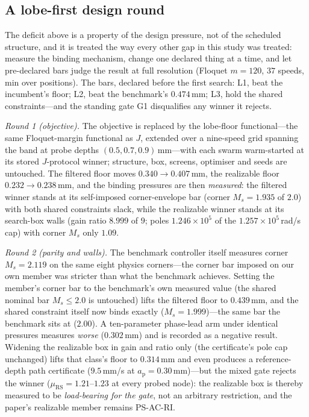 \documentclass[preprint,12pt]{elsarticle}
\newcommand{\ap}{a_{\mathrm{p}}}
\newcommand{\muRS}{\mu_{\mathrm{RS}}}
\begin{document}
\subsection*{A lobe-first design round}
\label{sec:lobefirst}

The deficit above is a property of the design pressure, not of the
scheduled structure, and it is treated the way every other gap in
this study was treated: measure the binding mechanism, change one
declared thing at a time, and let pre-declared bars judge the result
at full resolution (Floquet $m = 120$, $37$ speeds, min over
positions).  The bars, declared before the first search: L1, beat the
incumbent's floor; L2, beat the benchmark's $0.474$\,mm; L3, hold the
shared constraints---and the standing gate G1 disqualifies any winner
it rejects.

\emph{Round 1 (objective).}  The objective is replaced by the
lobe-floor functional---the same Floquet-margin functional as $J$,
extended over a nine-speed grid spanning the band at probe depths
$(0.5, 0.7, 0.9)$\,mm---with each swarm warm-started at its stored
$J$-protocol winner; structure, box, screens, optimiser and seeds are
untouched.  The filtered floor moves $0.340 \to 0.407$\,mm, the
realizable floor $0.232 \to 0.238$\,mm, and the binding pressures are
then \emph{measured}: the filtered winner stands at its self-imposed
corner-envelope bar (corner $M_s = 1.935$ of $2.0$) with both shared
constraints slack, while the realizable winner stands at its
search-box walls (gain ratio $8.999$ of $9$; poles
$1.246\times10^{5}$ of the $1.257\times10^{5}$\,rad/s cap) with
corner $M_s$ only $1.09$.

\emph{Round 2 (parity and walls).}  The benchmark controller itself
measures corner $M_s = 2.119$ on the same eight physics
corners---the corner bar imposed on our own member was stricter than
what the benchmark achieves.  Setting the member's corner bar to the
benchmark's own measured value (the shared nominal bar
$M_s \le 2.0$ is untouched) lifts the filtered floor to $0.439$\,mm,
and the shared constraint itself now binds exactly
($M_s = 1.999$)---the same bar the benchmark sits at ($2.00$).  A
ten-parameter phase-lead arm under identical pressures measures
\emph{worse} ($0.302$\,mm) and is recorded as a negative result.
Widening the realizable box in gain and ratio only (the certificate's
pole cap unchanged) lifts that class's floor to $0.314$\,mm and even
produces a reference-depth path certificate ($9.5$\,mm/s at
$\ap = 0.30$\,mm)---but the mixed gate rejects the winner
($\muRS = 1.21$--$1.23$ at every probed node): the realizable box is
thereby measured to be \emph{load-bearing for the gate}, not an
arbitrary restriction, and the paper's realizable member remains
PS-AC-RI.
\end{document}
